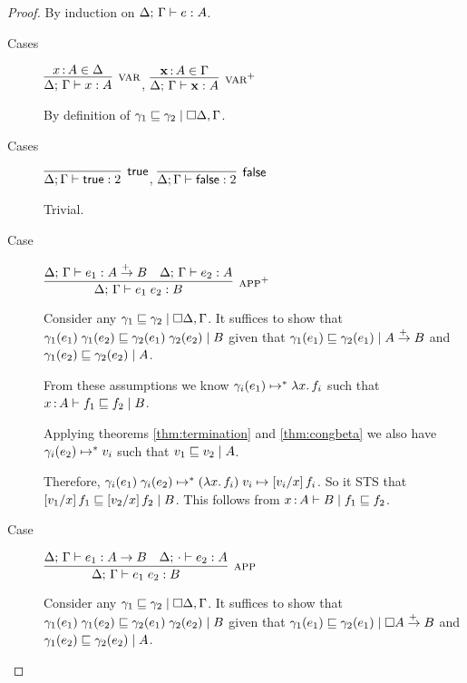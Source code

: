 \documentclass{article}
\begin{document}
\begin{proof}
  By induction on $\J{\GD}{\GG}{e}{A}$.
  \begin{description}
  \item[Cases] $\infer[\rt{var}]{\J{\GD}{\GG}{x}{A}}{x\of A \in \GD}$,
    $\infer[\rt{var}^+]{\J{\GD}{\GG}{\m{x}}{A}}{\m{x} \of A \in \GG}$

    By definition of $\lr{\cxdisc{\GD},\GG}{\gamma_1 \ale \gamma_2}$.

    \vspace{1em}
  \item[Cases] $\infer[\ms{true}]{\GD;\GG\ent \ms{true} : \bool}{}$,
    $\infer[\ms{false}]{\GD;\GG\ent \ms{false} : \bool}{}$

    Trivial.


    \vspace{1em}
  \item[Case] $\infer[\rt{app}^+]{\J{\GD}{\GG}{e_1\;e_2}{B}}
    {\J{\GD}{\GG}{e_1}{A \mto B} & \J{\GD}{\GG}{e_2}{A}}$


    Consider any $\lr{\cxdisc{\GD},\GG}{\gamma_1 \ale \gamma_2}$. It suffices to
    show that $\lr{B}{\gamma_1(e_1)\;\gamma_1(e_2) \ale
      \gamma_2(e_1)\;\gamma_2(e_2)}$ given that $\lr{A \mto B}{\gamma_1(e_1)
      \ale \gamma_2(e_1)}$ and $\lr{A}{\gamma_1(e_2) \ale \gamma_2(e_2)}$.

    From these assumptions we know $\gamma_i(e_1) \steps \fn\bind{x}{f_i}$ such
    that $\lrcx{x\of A}{B}{f_1 \ale f_2}$.

    Applying theorems \ref{thm:termination} and \ref{thm:congbeta} we also have
    $\gamma_i(e_2) \steps v_i$ such that $\lr{A}{v_1 \ale v_2}$.
    
    Therefore, $\gamma_i(e_1)\;\gamma_i(e_2) \steps (\fn\bind{x} f_i)\;v_i \step
    \sub{v_i/x} f_i$. So it STS that $\lr{B}{\sub{v_1/x} f_1 \ale \sub{v_2/x}
      f_2}$. This follows from $\lrcx{x \of A}{f_1 \ale f_2}{B}$.


    \vspace{1em}
  \item[Case] $\infer[\rt{app}]{\J{\GD}{\GG}{e_1\;e_2}{B}}
    {\J{\GD}{\GG}{e_1}{A \uto B} & \J{\GD}{\cdot}{e_2}{A}}$

    Consider any $\lr{\cxdisc{\GD},\GG}{\gamma_1 \ale \gamma_2}$. It suffices to
    show that $\lr{B}{\gamma_1(e_1)\;\gamma_1(e_2) \ale
      \gamma_2(e_1)\;\gamma_2(e_2)}$ given that $\lr{\disc{A} \mto
      B}{\gamma_1(e_1) \ale \gamma_2(e_1)}$ and $\lr{A}{\gamma_1(e_2) \ale
      \gamma_2(e_2)}$.


\end{description}
\end{proof}
\end{document}
